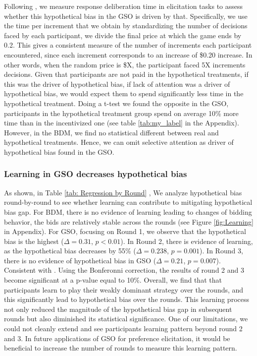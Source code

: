 \documentclass[12pt]{article}
\begin{document}
Following \citet{chabris2008measuring}, we measure response deliberation time in elicitation tasks to assess whether this hypothetical bias in the GSO is driven by that. Specifically, we use the time per increment that we obtain by standardizing the number of decisions faced by each participant, we divide the final price at which the game ends by 0.2. This gives a consistent measure of the number of increments each participant encountered, since each increment corresponds to an increase of \$0.20 increase. In other words, when the random price is \$X, the participant faced 5X increments decisions. Given that participants are not paid in the hypothetical treatments, if this was the driver of hypothetical bias, if lack of attention was a driver of hypothetical bias, we would expect them to spend significantly less time in the hypothetical treatment. Doing a t-test we found the opposite in the GSO, participants in the hypothetical treatment group spend on average 10\% more time than in the incentivized one (see table \ref{tab:my_label} in the Appendix).  However, in the BDM, we find no statistical different between real and hypothetical treatments. Hence, we can omit selective attention as driver of hypothetical bias found in the GSO.





\subsubsection{Learning in GSO decreases hypothetical bias}
As shown, in Table \ref{tab: Regression by Round} , We analyze hypothetical bias round-by-round to see whether learning can contribute to mitigating hypothetical bias gap. For BDM, there is no evidence of learning leading to changes of bidding behavior, the bids are relatively stable across the rounds (see Figure \ref{fig:Learning} in Appendix).
For GSO, focusing on Round 1, we observe that the hypothetical bias is the highest (\(\Delta = 0.31\), \(p < 0.01\)). In Round 2, there is evidence of learning, as the hypothetical bias decreases by 55\% (\(\Delta = 0.238\), \(p = 0.001\)). In Round 3, there is no evidence of hypothetical bias in GSO (\(\Delta = 0.21\), \(p = 0.007\)). Consistent with \citet{brown_is_2023}. Using the Bonferonni correction, the results of round 2 and 3 become significant at a p-value equal to 10\%. Overall, we find that that participants learn to play their weakly dominant strategy over the rounds, and this significantly lead to hypothetical bias over the rounds. This learning process not only reduced the magnitude of the hypothetical bias gap in subsequent rounds but also diminished its statistical significance. One of our limitations, we could not cleanly extend and see participants learning pattern beyond round 2 and 3. In future applications of GSO for preference elicitation, it would be beneficial to increase the number of rounds to measure this learning pattern.
\end{document}
